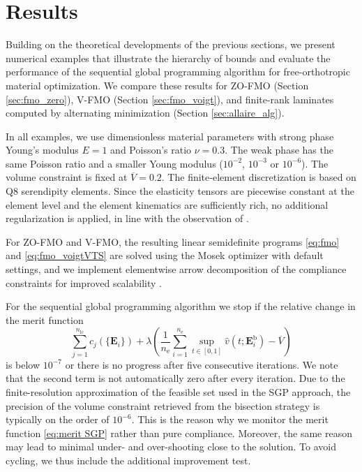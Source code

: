 \documentclass[preprint,3p]{elsarticle}
\newcommand{\tensf}[1]{\bm{\mathbf{#1}}}            %
\newcommand{\Ei}{\tensf{E}_i}                       %
\newcommand{\nel}{n_\mathrm{e}}                     %
\newcommand{\nlc}{n_\mathrm{lc}}                    %
\begin{document}
\section{Results}\label{sec:results}

Building on the theoretical developments of the previous sections, we present numerical examples that illustrate the hierarchy of bounds and evaluate the performance of the sequential global programming algorithm for free-orthotropic material optimization. We compare these results for ZO-FMO (Section \ref{sec:fmo_zero}), V-FMO (Section \ref{sec:fmo_voigt}), and finite-rank laminates computed by alternating minimization (Section \ref{sec:allaire_alg}).

In all examples, we use dimensionless material parameters with strong phase Young’s modulus $E=1$ and Poisson's ratio $\nu=0.3$. The weak phase has the same Poisson ratio and a smaller Young modulus ($10^{-2}$, $10^{-3}$ or $10^{-6}$). The volume constraint is fixed at $\overline{V}=0.2$. The finite‑element discretization is based on Q$8$ serendipity elements. Since the elasticity tensors are piecewise constant at the element level and the element kinematics are sufficiently rich, no additional regularization is applied, in line with the observation of \citet{Jog1994}. 

For ZO-FMO and V-FMO, the resulting linear semidefinite programs \eqref{eq:fmo} and \eqref{eq:fmo_voigtVTS} are solved using the Mosek optimizer with default settings, and we implement elementwise arrow decomposition of the compliance constraints for improved scalability \citep{Kocvara2020}.

For the sequential global programming algorithm we stop if the relative change in the merit function 
%
\begin{equation}\label{eq:merit SGP}
    \sum_{j=1}^{\nlc} c_j\left(\{\Ei\}\right) + \lambda\left( \frac{1}{\nel}\sum_{i=1}^{\nel} \sup_{t \in [0,1]} \hat{v}(t;\Ei^{\mathrm{b}}) - \overline{V}\right)
\end{equation}
%
is below $10^{-7}$ or there is no progress after five consecutive iterations. We note that the second term is not automatically zero after every iteration. Due to the finite-resolution approximation of the feasible set used in the SGP approach, the precision of the volume constraint retrieved from the bisection strategy is typically on the order of $10^{-6}$. This is the reason why we monitor the merit function \eqref{eq:merit SGP} rather than pure compliance. Moreover, the same reason may lead to minimal under- and over-shooting close to the solution. To avoid cycling, we thus include the additional improvement test.
\end{document}
